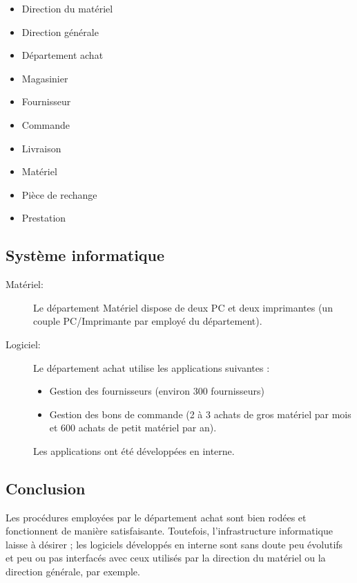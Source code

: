 \begin{itemize}
\item Direction du matériel
\item Direction générale
\item Département achat
\item Magasinier
\item Fournisseur
\item Commande
\item Livraison
\item Matériel
\item Pièce de rechange
\item Prestation
\end{itemize}


\subsection{Système informatique}

\begin{description}
    \item [Matériel:]\el
Le département Matériel dispose de deux PC et deux imprimantes (un couple
PC/Imprimante par employé du département).

    \item [Logiciel:]\el
Le département achat utilise les applications suivantes :
    \begin{itemize}
\item Gestion des fournisseurs (environ 300 fournisseurs)
\item Gestion des bons de commande (2 à 3 achats de gros matériel par mois
        et 600 achats de petit matériel par an).
    \end{itemize}

Les applications ont été développées en interne.

\end{description}

\subsection{Conclusion}

Les procédures employées par le département achat sont bien rodées et
fonctionnent de manière satisfaisante. Toutefois, l'infrastructure
informatique laisse à désirer ; les logiciels développés en interne sont
sans doute peu évolutifs et peu ou pas interfacés avec ceux utilisés par la
direction du matériel ou la direction générale, par exemple.

\vfill
\pagebreak
